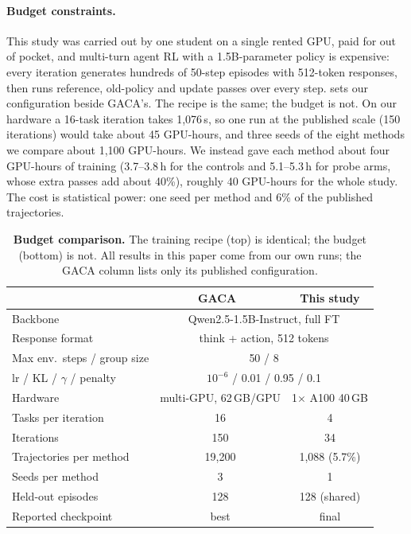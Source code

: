 \paragraph{Budget constraints.}
\label{sec:budget}
This study was carried out by one student on a single rented GPU, paid for out of pocket, and
multi-turn agent RL with a 1.5B-parameter policy is expensive: every iteration generates hundreds of
50-step episodes with 512-token responses, then runs reference, old-policy and update passes over every
step.  sets our configuration beside GACA's. The recipe is the same; the budget is not.
On our hardware a 16-task iteration takes 1,076\,s, so one run at the published scale (150 iterations)
would take about 45 GPU-hours, and three seeds of the eight methods we compare about 1,100 GPU-hours.
We instead gave each method about four GPU-hours of training (3.7--3.8\,h for the controls and
5.1--5.3\,h for probe arms, whose extra passes add about 40\%), roughly 40 GPU-hours for the whole
study. The cost is statistical power: one seed per method and 6\% of the published trajectories.

\begin{table}[t]
\centering\footnotesize
\setlength{\tabcolsep}{4pt}
\begin{tabular}{@{}lcc@{}}
\toprule
 & GACA~\cite{liang2026gaca} & This study \\
\midrule
Backbone & \multicolumn{2}{c}{Qwen2.5-1.5B-Instruct, full FT} \\
Response format & \multicolumn{2}{c}{think + action, 512 tokens} \\
Max env.\ steps / group size & \multicolumn{2}{c}{50 / 8} \\
lr / KL / $\gamma$ / penalty & \multicolumn{2}{c}{$10^{-6}$ / 0.01 / 0.95 / 0.1} \\
\midrule
Hardware & multi-GPU, 62\,GB/GPU & 1$\times$ A100 40\,GB \\
Tasks per iteration & 16 & 4 \\
Iterations & 150 & 34 \\
Trajectories per method & 19,200 & 1,088 (5.7\%) \\
Seeds per method & 3 & 1 \\
Held-out episodes & 128 & 128 (shared) \\
Reported checkpoint & best & final \\
\bottomrule
\end{tabular}
\caption{\textbf{Budget comparison.} The training recipe (top) is identical; the budget (bottom) is
not. All results in this paper come from our own runs; the GACA column lists only its published
configuration.}
\label{tab:budget}
\end{table}

